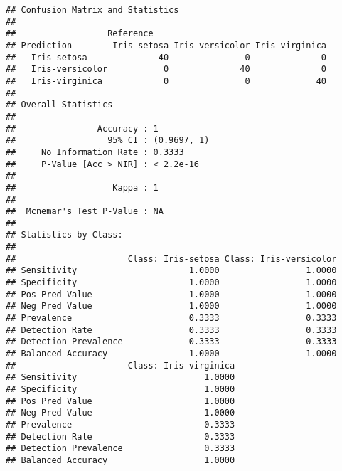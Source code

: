 \documentclass[]{article}
\newenvironment{Shaded}{\begin{snugshade}}{\end{snugshade}}
\newcommand{\KeywordTok}[1]{\textcolor[rgb]{0.13,0.29,0.53}{\textbf{#1}}}
\newcommand{\OperatorTok}[1]{\textcolor[rgb]{0.81,0.36,0.00}{\textbf{#1}}}
\newcommand{\NormalTok}[1]{#1}
\begin{document}
\begin{verbatim}
## Confusion Matrix and Statistics
## 
##                  Reference
## Prediction        Iris-setosa Iris-versicolor Iris-virginica
##   Iris-setosa              40               0              0
##   Iris-versicolor           0              40              0
##   Iris-virginica            0               0             40
## 
## Overall Statistics
##                                      
##                Accuracy : 1          
##                  95% CI : (0.9697, 1)
##     No Information Rate : 0.3333     
##     P-Value [Acc > NIR] : < 2.2e-16  
##                                      
##                   Kappa : 1          
##                                      
##  Mcnemar's Test P-Value : NA         
## 
## Statistics by Class:
## 
##                      Class: Iris-setosa Class: Iris-versicolor
## Sensitivity                      1.0000                 1.0000
## Specificity                      1.0000                 1.0000
## Pos Pred Value                   1.0000                 1.0000
## Neg Pred Value                   1.0000                 1.0000
## Prevalence                       0.3333                 0.3333
## Detection Rate                   0.3333                 0.3333
## Detection Prevalence             0.3333                 0.3333
## Balanced Accuracy                1.0000                 1.0000
##                      Class: Iris-virginica
## Sensitivity                         1.0000
## Specificity                         1.0000
## Pos Pred Value                      1.0000
## Neg Pred Value                      1.0000
## Prevalence                          0.3333
## Detection Rate                      0.3333
## Detection Prevalence                0.3333
## Balanced Accuracy                   1.0000
\end{verbatim}

\begin{Shaded}
\end{Shaded}
\end{document}
